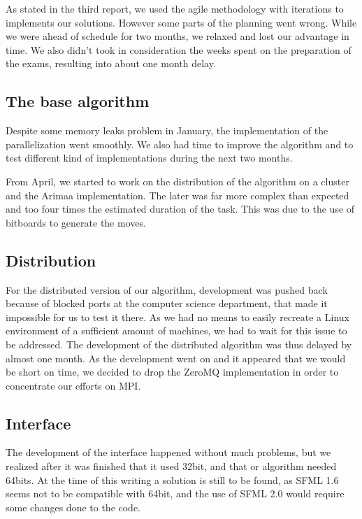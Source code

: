 As stated in the third report, we used the agile methodology with iterations to implements our solutions. However some parts of the planning went wrong. While we were ahead of schedule for two months, we relaxed and lost our advantage in time. We also didn't took in consideration the weeks spent on the preparation of the exams, resulting into about one month delay.

\subsection{The base algorithm}
Despite some memory leaks problem in January, the implementation of the parallelization went smoothly. We also had time to improve the algorithm and to test different kind of implementations during the next two months.

From April, we started to work on the distribution of the algorithm on a cluster and the Arimaa implementation. The later was far more complex than expected and too four times the estimated duration of the task. This was due to the use of bitboards to generate the moves.

\subsection{Distribution}
For the distributed version of our algorithm, development was pushed back because of blocked ports at the computer science department, that made it impossible for us to test it there.
As we had no means to easily recreate a Linux environment of a sufficient amount of machines, we had to wait for this issue to be addressed. The development of the distributed algorithm was thus delayed by almost one month.
As the development went on and it appeared that we would be short on time, we decided to drop the ZeroMQ implementation in order to concentrate our efforts on MPI.

\subsection{Interface}
The development of the interface happened without much problems, but we realized after it was finished that it used 32bit, and that or algorithm needed 64bits.
At the time of this writing a solution is still to be found, as SFML 1.6 seems not to be compatible with 64bit, and the use of SFML 2.0 would require some changes done to the code.